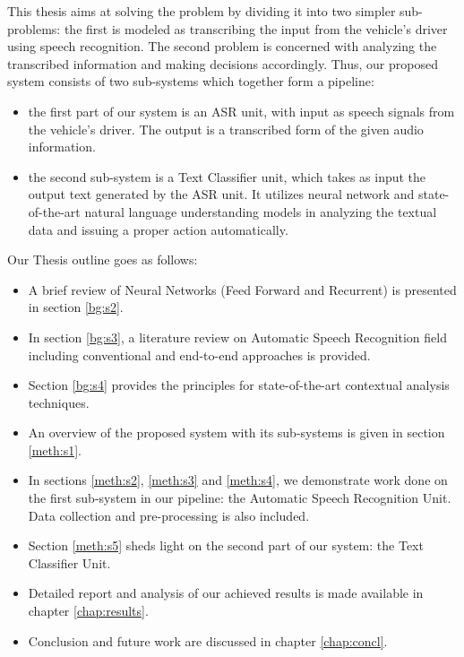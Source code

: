 This thesis aims at solving the problem by dividing it into two simpler sub-problems: the first is modeled as transcribing the input from the vehicle's driver using speech recognition. The second problem is concerned with analyzing the transcribed information and making decisions accordingly. Thus, our proposed system consists of two sub-systems which together form a pipeline: 

\begin{itemize}
	\item the first part of our system is an \ac{ASR} unit, with input as speech signals from the vehicle's driver. The output is a transcribed form of the given audio information.
	\item the second sub-system is a Text Classifier unit, which takes as input the output text generated by the \ac{ASR} unit. It utilizes neural network and state-of-the-art natural language understanding models in analyzing the textual data and issuing a proper action automatically.
\end{itemize}



Our Thesis outline goes as follows:

\begin{itemize}
	\item A brief review of Neural Networks (Feed Forward and Recurrent) is presented in section \ref{bg:s2}.
	\item In section \ref{bg:s3}, a literature review on Automatic Speech Recognition field including conventional and end-to-end approaches is provided.
	\item Section \ref{bg:s4} provides the principles for state-of-the-art contextual analysis techniques.
	\item An overview of the proposed system with its sub-systems is given in section \ref{meth:s1}. 
	\item In sections \ref{meth:s2}, \ref{meth:s3} and \ref{meth:s4}, we demonstrate work done on the first sub-system in our pipeline: the Automatic Speech Recognition Unit. Data collection and pre-processing is also included.
	\item Section \ref{meth:s5} sheds light on the second part of our system: the Text Classifier Unit.
	\item Detailed report and analysis of our achieved results is made available in chapter \ref{chap:results}.
	\item Conclusion and future work are discussed in chapter \ref{chap:concl}.
\end{itemize}


